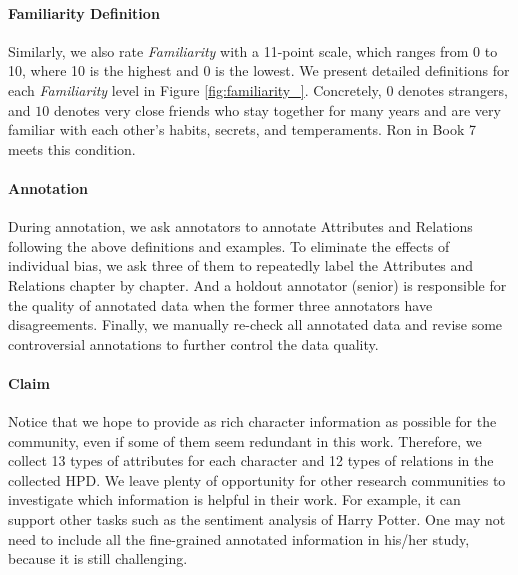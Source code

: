\documentclass[11pt]{article}
\begin{document}
\paragraph{Familiarity Definition} Similarly, we also rate \textit{Familiarity} with a 11-point scale, which ranges from 0 to 10, where 10 is the highest and 0 is the lowest. We present detailed definitions for each \textit{Familiarity} level in Figure \ref{fig:familiarity_}.
Concretely, $0$ denotes strangers, and $10$ denotes very close friends who stay together for many years and are very familiar with each other's habits, secrets, and temperaments. Ron in Book 7 meets this condition.



\paragraph{Annotation}
During annotation,
we ask annotators to annotate Attributes and Relations following the above definitions and examples.
To eliminate the effects of individual bias, we ask three of them to repeatedly label the Attributes and Relations chapter by chapter. And a holdout annotator (senior) is responsible for the quality of annotated data when the former three annotators have disagreements. Finally, we manually re-check all annotated data and revise some controversial annotations to further control the data quality.

\paragraph{Claim} Notice that we hope to provide as  rich character information as possible for the community, even if some of them seem redundant in this work. Therefore, we collect 13 types of attributes for each character and 12 types of relations in the collected HPD.
We leave plenty of opportunity for other research communities to investigate which information is helpful in their work.  For example, it can support other tasks such as the sentiment analysis of Harry Potter. One may not need to include all the fine-grained annotated information in his/her study, because it is still challenging.
\end{document}
